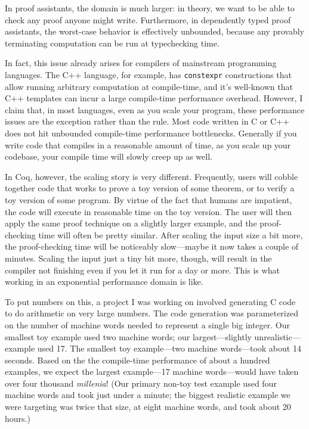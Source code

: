 In proof assistants, the domain is much larger: in theory, we want to be able to check any proof anyone might write.
Furthermore, in dependently typed proof assistants, the worst-case behavior is effectively unbounded, because any provably terminating computation can be run at typechecking time.

In fact, this issue already arises for compilers of mainstream programming languages.
The C++ language, for example, has \texttt{constexpr} constructions that allow running arbitrary computation at compile-time, and it's well-known that C++ templates can incur a large compile-time performance overhead.
However, I claim that, in most languages, even as you scale your program, these performance issues are the exception rather than the rule.
Most code written in C or C++ does not hit unbounded compile-time performance bottlenecks.
Generally if you write code that compiles in a reasonable amount of time, as you scale up your codebase, your compile time will slowly creep up as well.

In Coq, however, the scaling story is very different.
Frequently, users will cobble together code that works to prove a toy version of some theorem, or to verify a toy version of some program.
By virtue of the fact that humans are impatient, the code will execute in reasonable time on the toy version.
The user will then apply the same proof technique on a slightly larger example, and the proof-checking time will often be pretty similar.
After scaling the input size a bit more, the proof-checking time will be noticeably slow---maybe it now takes a couple of minutes.
Scaling the input just a tiny bit more, though, will result in the compiler not finishing even if you let it run for a day or more.
This is what working in an exponential performance domain is like.

To put numbers on this, a project I was working on involved generating C code to do arithmetic on very large numbers.
The code generation was parameterized on the number of machine words needed to represent a single big integer.
Our smallest toy example used two machine words; our largest---slightly unrealistic---example used 17.
The smallest toy example---two machine words---took about 14 seconds.
Based on the the compile-time performance of about a hundred examples, we expect the largest example---17 machine words---would have taken over four thousand \emph{millenia}!
(Our primary non-toy test example used four machine words and took just under a minute; the biggest realistic example we were targeting was twice that size, at eight machine words, and took about 20 hours.)

